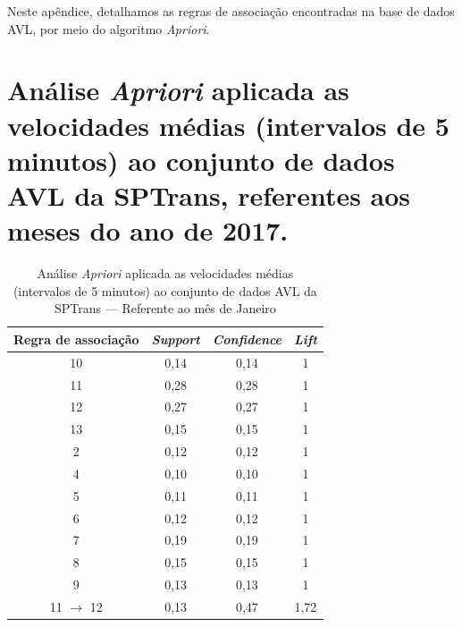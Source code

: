 \documentclass[
	12pt,				%
	oneside,			%
	a4paper,			%
	english,			%
	brazil				%
	]{abntex2ppgsi}
\begin{document}
{{{\begin{apendicesenv}
Neste apêndice, detalhamos as regras de associação encontradas na base de dados AVL, por meio do algoritmo \textit{Apriori}.

\section{Análise \textit{Apriori} aplicada as velocidades médias (intervalos de 5 minutos) ao conjunto de dados AVL da SPTrans, referentes aos meses do ano de 2017.}
\label{g1}

\begin{table}[!htb]
\centering
\caption {Análise \textit{Apriori} aplicada as velocidades médias (intervalos de 5 minutos) ao conjunto de dados AVL da SPTrans --- Referente ao mês de Janeiro}
\label {tab:aprioriJanuary}
\begin{tabular}{c|c|c|c}
\toprule
\textbf{Regra de associação} & \textit{\textbf{Support}} & \textit{\textbf{Confidence}} & \textit{\textbf{Lift}} \\
\midrule
10 &  0,14 &  0,14 &  1\\
\hline
11 &  0,28 &  0,28 &  1\\
\hline
12 &  0,27 &  0,27 &  1\\
\hline
13 &  0,15 &  0,15 &  1\\
\hline
2 &  0,12 &  0,12&  1\\
\hline
4 &  0,10&  0,10 &  1\\
\hline
5 &  0,11 &  0,11 &  1\\
\hline
6 &  0,12 &  0,12 &  1\\
\hline
7 &  0,19 &  0,19 &  1\\
\hline
8 &  0,15 &  0,15&  1\\
\hline
9 &  0,13 &  0,13 &  1\\
\hline
11 $\rightarrow$ 12 &  0,13 &  0,47&  1,72\\
\bottomrule
\end{tabular}
\end{table}


\end{apendicesenv}}}}
\end{document}
